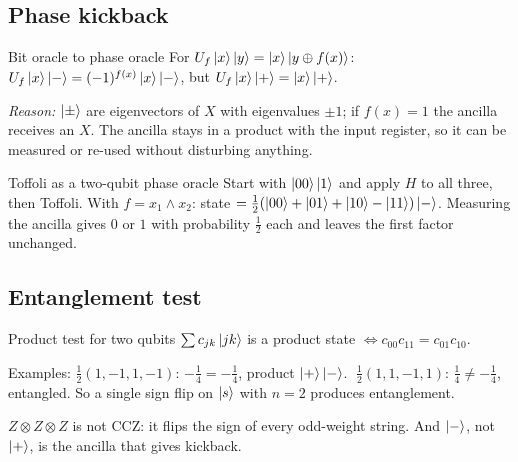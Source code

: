 \documentclass[11pt,a4paper,openany]{book}
\newcounter{wex}[section]
\begin{document}
\subsection{Phase kickback}
\begin{keyres}{Bit oracle to phase oracle}
For $U_f\ket{x}\ket{y} = \ket{x}\ket{y \oplus f(x)}$: \quad $U_f\ket{x}\ket{-} = (-1)^{f(x)}\ket{x}\ket{-}$, \quad but \quad $U_f\ket{x}\ket{+} = \ket{x}\ket{+}$.
\end{keyres}
\emph{Reason:} $\ket{\pm}$ are eigenvectors of $X$ with eigenvalues $\pm1$; if $f(x) = 1$ the ancilla receives an $X$. The ancilla stays in a product with the input register, so it can be measured or re-used without disturbing anything.

\begin{wexample}{Toffoli as a two-qubit phase oracle}
Start with $\ket{00}\ket{1}$ and apply $H$ to all three, then Toffoli. With $f = x_1 \land x_2$: state $= \frac12(\ket{00} + \ket{01} + \ket{10} - \ket{11})\ket{-}$. Measuring the ancilla gives $0$ or $1$ with probability $\frac12$ each and leaves the first factor unchanged.
\end{wexample}

\subsection{Entanglement test}
\begin{keyres}{Product test for two qubits}
$\sum c_{jk}\ket{jk}$ is a product state $\iff c_{00}c_{11} = c_{01}c_{10}$.
\end{keyres}
Examples: $\frac12(1, -1, 1, -1)$: $-\frac14 = -\frac14$, product $\ket{+}\ket{-}$. $\;\frac12(1, 1, -1, 1)$: $\frac14 \ne -\frac14$, entangled. So a single sign flip on $\ket{s}$ with $n = 2$ produces entanglement.

\begin{trap}
$Z \otimes Z \otimes Z$ is not CCZ: it flips the sign of every odd-weight string. And $\ket{-}$, not $\ket{+}$, is the ancilla that gives kickback.
\end{trap}

\end{document}
